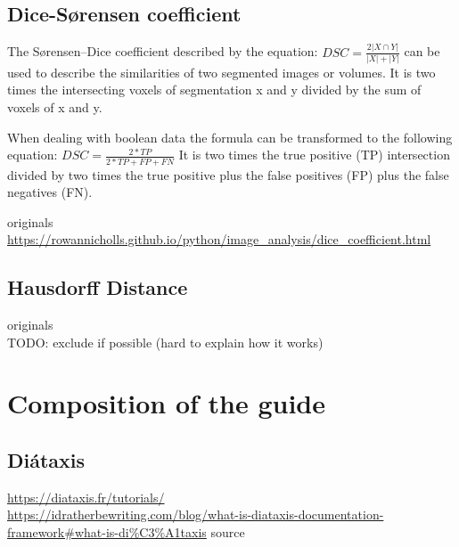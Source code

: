 \subsection{Dice-Sørensen coefficient}
\label{s:dice-coefficient}
The Sørensen–Dice coefficient described by the equation:
\begin{math}
DSC=\frac{2|X\cap Y|}{|X|+|Y|}
\end{math}
can be used to describe the similarities of two segmented images or volumes.
It is two times the intersecting voxels of segmentation x and y divided by the sum of voxels of x and y.

When dealing with boolean data the formula can be transformed to the following equation:
\begin{math}
DSC=\frac{2*TP}{2*TP+FP+FN}
\end{math}
It is two times the true positive (TP) intersection divided by two times the true positive plus the false positives (FP) plus the false negatives (FN).

originals \cite{diceMeasuresAmountEcologic1945}\\

\url{https://rowannicholls.github.io/python/image_analysis/dice_coefficient.html}


\subsection{Hausdorff Distance}
\label{s:hausdorff-distance}
originals\cite{rockafellarVariationalAnalysis1998,hausdorffGrundzuegeMengenlehre1978}\\
TODO: exclude if possible (hard to explain how it works)


\section{Composition of the guide}
\label{s:guide-creation}
\subsection{Diátaxis}
\url{https://diataxis.fr/tutorials/}\\
\url{https://idratherbewriting.com/blog/what-is-diataxis-documentation-framework#what-is-di%C3%A1taxis}
source\cite{procidaDiataxisDocumentationFramework2023}

